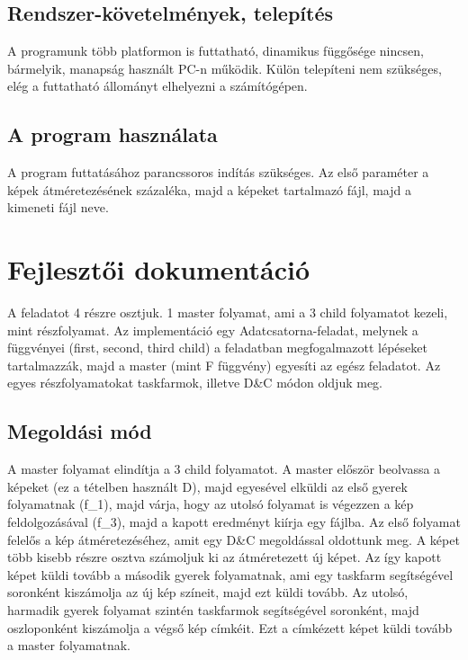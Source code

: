 \documentclass[12pt]{article}
\begin{document}
\subsection{Rendszer-követelmények, telepítés}

A programunk több platformon is futtatható, dinamikus függősége nincsen, bármelyik, manapság használt PC-n működik. Külön telepíteni nem szükséges, elég a futtatható állományt elhelyezni a számítógépen.

\subsection{A program használata}

A program futtatásához parancssoros indítás szükséges. Az első paraméter a képek átméretezésének százaléka, majd a képeket tartalmazó fájl, majd a kimeneti fájl neve.

\section{Fejlesztői dokumentáció}

A feladatot 4 részre osztjuk. 1 master folyamat, ami a 3 child folyamatot kezeli, mint részfolyamat. Az implementáció egy Adatcsatorna-feladat, melynek a függvényei (first, second, third child) a feladatban megfogalmazott lépéseket tartalmazzák, majd a master (mint F függvény) egyesíti az egész feladatot. Az egyes részfolyamatokat taskfarmok, illetve D\&C módon oldjuk meg.

\subsection{Megoldási mód}

A master folyamat elindítja a 3 child folyamatot. A master először beolvassa a képeket (ez a tételben használt D), majd egyesével elküldi az első gyerek folyamatnak (f\_1), majd várja, hogy az utolsó folyamat is végezzen a kép feldolgozásával (f\_3), majd a kapott eredményt kiírja egy fájlba. Az első folyamat felelős a kép átméretezéséhez, amit egy D&C megoldással oldottunk meg. A képet több kisebb részre osztva számoljuk ki az átméretezett új képet. Az így kapott képet küldi tovább a második gyerek folyamatnak, ami egy taskfarm segítségével soronként kiszámolja az új kép színeit, majd ezt küldi tovább. Az utolsó, harmadik gyerek folyamat szintén taskfarmok segítségével soronként, majd oszloponként kiszámolja a végső kép címkéit. Ezt a címkézett képet küldi tovább a master folyamatnak.
\end{document}
